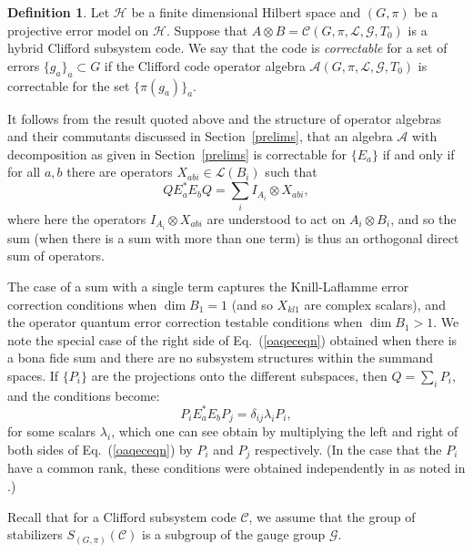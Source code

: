 \documentclass[11pt]{article}
\theoremstyle{definition}
\newtheorem{definition}{Definition}
\newcommand{\calC}{\mathcal{C}}
\newcommand{\calG}{\mathcal{G}}
\newcommand{\calH}{\mathcal{H}}
\newcommand{\calL}{\mathcal{L}}
\begin{document}
\begin{definition}
    Let $\calH$ be a finite dimensional Hilbert space and $(G,\pi)$ be a projective error model on $\calH$. Suppose that $A \otimes B = \calC(G,\pi,\calL,\calG,T_0)$ is a hybrid Clifford subsystem code. We say that the code is \emph{correctable} for a set of errors $\{g_a\}_{a} \subset G$ if the Clifford code operator algebra $\mathcal A (G,\pi,\calL,\calG,T_0)$ is correctable for the set $\{\pi(g_a)\}_{a}$.
\end{definition} 

It follows from the result quoted above and the structure of operator algebras and their commutants discussed in Section~\ref{prelims}, that an algebra $\mathcal A$ with decomposition as given in  Section~\ref{prelims}  is correctable for $\{ E_a \}$ if and only if for all $a,b$ there are operators $X_{abi} \in \mathcal L(B_i)$ such that
\begin{equation}\label{oaqeceqn}
Q E_a^* E_b Q = \sum_i I_{A_i} \otimes X_{abi},
\end{equation}
where here the operators $I_{A_i} \otimes X_{abi}$ are understood to act on $A_i \otimes B_i$, and so the sum (when there is a sum with more than one term) is thus an orthogonal direct sum of operators. 

The case of a sum with a single term captures the Knill-Laflamme error correction conditions \cite{knill1997theory} when $\dim B_1 = 1$ (and so $X_{kl1}$ are complex scalars), and the operator quantum error correction testable conditions \cite{Kribs2005Unified,Kribs2006oqec} when $\dim B_1 > 1$. We note the special case of the right side of Eq.~(\ref{oaqeceqn}) obtained when there is a bona fide sum and there are no subsystem structures within the summand spaces. If $\{P_i \}$ are the projections onto the different subspaces, then $Q= \sum_i P_i$, and the conditions become: 
\begin{equation*}
    P_i E_a^* E_b P_j = \delta_{ij} \lambda_i P_i,
\end{equation*}
for some scalars $\lambda_i$, which one can see obtain by multiplying the left and right of both sides of Eq.~(\ref{oaqeceqn}) by $P_i$ and $P_j$ respectively. (In the case that the $P_i$ have a common rank, these conditions were obtained independently in \cite{grassl2017codes} as noted in \cite{majidy2018unification}.) 

Recall that for a Clifford subsystem code $\calC$, we assume that the group of stabilizers $S_{(G,\pi)}(\calC)$ is a subgroup of the gauge group $\calG$.
\end{document}
